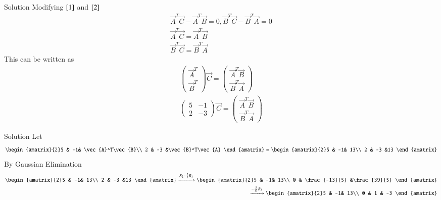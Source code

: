 \documentclass{beamer}
\begin{document}
\begin{frame}{Solution}
Modifying $\eqref{1}$ and $\eqref{2}$
\begin{align}
\vec{A}^T\vec{C}-\vec{A}^T\vec{B}=0,\vec{B}^T\vec{C}-\vec{B}^T\vec{A}=0\\
\vec{A}^T\vec{C}=\vec{A}^T\vec{B} \label{3}\\ \vec{B}^T\vec{C}=\vec{B}^T\vec{A} \label{4}
\end{align}
This can be written as
\begin{align}
    \begin{pmatrix}\vec{A}^T \\ \vec{B}^T \end{pmatrix}\vec{C}=\begin{pmatrix}\vec{A}^T\vec{B}\\ \vec{B}^T\vec{A} \end{pmatrix}\\
    \begin{pmatrix}5 & -1\\ 2 & -3\end{pmatrix}\vec{C}=\begin{pmatrix}\vec{A}^T\vec{B}\\ \vec{B}^T\vec{A} \end{pmatrix} \label{5}
\end{align}
\end{frame}
\begin{frame}{Solution}
Let
\begin{align}
    \begin{amatrix}{2}5 & -1& \vec{A}^T\vec{B}\\ 2 & -3 &\vec{B}^T\vec{A} \end{amatrix} = \begin{amatrix}{2}5 & -1& 13\\ 2 & -3 &13 \end{amatrix}
\end{align}
By Gaussian Elimination
\begin{align}
    \begin{amatrix}{2}5 & -1& 13\\ 2 & -3 &13 \end{amatrix}\xrightarrow{R_2-\frac{2}{5}R_1}\begin{amatrix}{2}5 & -1& 13\\ 0 & \frac{-13}{5} &\frac{39}{5} \end{amatrix}\\
    \xrightarrow{-\frac{5}{13}R_2}\begin{amatrix}{2}5 & -1& 13\\ 0 & 1 & -3 \end{amatrix}
\end{align}
\end{frame}
\end{document}

